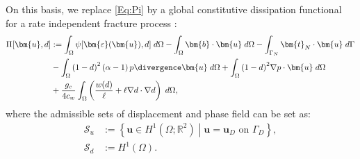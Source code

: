 On this basis, we replace \eqref{Eq:Pi} by a global constitutive dissipation functional for a rate independent fracture process \cite{BourdinCFRAC13}:
\begin{equation}\label{Eq:Dissipative_functional}
    \begin{aligned}
        \Pi[\bm{u},d] &:= \int_{\Omega} \psi[\bm{\varepsilon}(\bm{u}),d] \; d\Omega
	    - \int_{\Omega} \bm{b} \cdot \bm{u} \; d\Omega
	    - \int_{\Gamma_N} \bm{t}_N\cdot \bm{u} \; d\Gamma \\
	    &- \int_{\Omega}{\left(1 - d\right)}^2\left(\alpha - 1\right)p\divergence\bm{u}\; d\Omega + 
	    \int_{\Omega}{\left(1 - d\right)}^2\nabla p\cdot \bm{u}\; d\Omega \\
	    &+ \frac{g_c}{4c_{w}}\int_\Omega \left(\frac{w(d)}{\ell} + \ell \nabla d\cdot\nabla d\right)\;d\Omega,\\
    \end{aligned}
\end{equation}
where the admissible {sets} of displacement and phase field can be {set as}:
\begin{equation*}
    \begin{aligned}
        \mathscr{S}_u &:= \left\{\bm{u} \in H^1\left(\Omega; \mathbb{R}^2\right) \middle|
        \bm{u} = \bm{u}_D \text{ on } \Gamma_D\right\}, \\
        \mathscr{S}_d &:= H^1(\Omega).
    \end{aligned}
\end{equation*}



